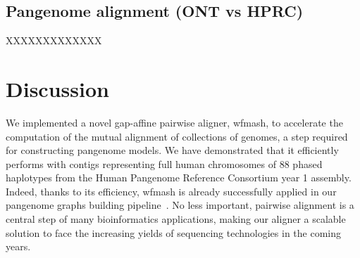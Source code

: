 \documentclass{bioinfo}
\theoremstyle{definition}
\begin{document}
\subsection{Pangenome alignment (ONT vs HPRC)}
XXXXXXXXXXXXX


\begin{comment}

\begin{table}[!t]
    \processtable{
        \small
        Performance of pairwise alignment of long sequences from the \textit{Saccharomyces cerevisiae}
        chromosome IV.
        \label{Tab:01}} {
        \begin{tabular}{@{}llllllll@{}}
            \toprule Aligner & Divergence & Length & Runtime (mm:ss) & Memory (GB) & Precision & Sensitivity & F-measure \\
            \midrule
            row1             & row1       & row1   & row1            & row1        & row1      & row1        & row1      \\
            row2             & row2       & row2   & row2            & row1        & row1      & row1        & row1      \\
            row3             & row3       & row3   & row3            & row1        & row1      & row1        & row1      \\
            row4             & row4       & row4   & row4            & row1        & row1      & row1        & row1      \\
            \botrule
        \end{tabular}
    }
\end{table}


\subsection{Real data}
\\


\end{comment}


\section{Discussion}
\label{sec:discussion}

We implemented a novel gap-affine pairwise aligner, wfmash, to accelerate the computation of the mutual alignment of collections of genomes, a step required for constructing pangenome models.
We have demonstrated that it efficiently performs with contigs representing full human chromosomes of 88 phased haplotypes from the Human Pangenome Reference Consortium year 1 assembly.
Indeed, thanks to its efficiency, wfmash is already successfully applied in our pangenome graphs building pipeline~\citep{pggb}.
No less important, pairwise alignment is a central step of many bioinformatics applications, making our aligner a scalable solution to face the increasing yields of sequencing technologies in the coming years.
\end{document}
